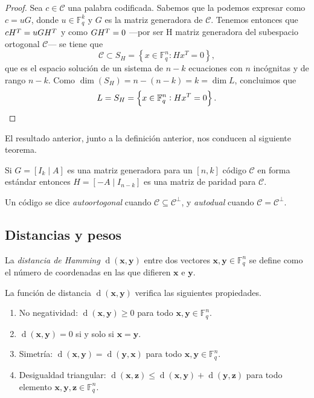 \begin{proof}
  Sea \(c \in \mathcal C\) una palabra codificada. Sabemos que la podemos expresar como \(c = uG\), donde \(u \in \mathbb F_q^k\) y \(G\) es la matriz generadora de \(\mathcal C\). Tenemos entonces que \(c\cramped{H^T} = uG\cramped{H^T}\) y como \(G\cramped{H^T} = 0\) —por ser H matriz generadora del subespacio ortogonal \(\mathcal C\)— se tiene que \[\mathcal C \subset S_H = \left\{x \in \mathbb F_q^n : Hx^T = 0\right\},\] que es el espacio solución de un sistema de \(n - k\) ecuaciones con \(n\) incógnitas y de rango \(n - k\). Como \(\dim(S_H) = n - (n - k) = k = \dim L\), concluimos que \[L = S_H = \left\{x \in \mathbb F_q^n : Hx^T = 0\right\}.\qedhere\]
\end{proof}

El resultado anterior, junto a la definición anterior, nos conducen al siguiente teorema. 

\begin{theorem}
  Si \(G = [I_k \mid A]\) es una matriz generadora para un \([n, k]\) código \(\mathcal C\) en forma estándar entonces \(H = [-A \mid I_{n-k}]\) es una matriz de paridad para \(\mathcal C\).
\end{theorem}

Un código se dice \textit{autoortogonal} cuando \(\mathcal C \subseteq \mathcal C^{\perp}\), y \textit{autodual} cuando \(\mathcal C = \mathcal C^{\perp}\).

\subsection{Distancias y pesos}

\begin{definition}
  La \textit{distancia de Hamming} \(\operatorname{d}(\symbf{x}, \symbf{y})\) entre dos vectores \(\symbf{x}, \symbf{y} \in \mathbb F_q^n\) se define como el número de coordenadas en las que difieren \(\symbf{x}\) e \(\symbf{y}\).
\end{definition}

\begin{theorem}
  La función de distancia \(\operatorname{d}(\symbf{x}, \symbf{y})\) verifica las siguientes propiedades.
  \begin{enumerate}
    \item No negatividad: \(\operatorname{d}(\symbf{x}, \symbf{y}) \geq 0\) para todo \(\symbf{x}, \symbf{y}\in \mathbb F_q^n\).
    \item \(\operatorname{d}(\symbf{x}, \symbf{y}) = 0\) si y solo si \(\symbf{x} = \symbf{y}\).
    \item Simetría: \(\operatorname{d}(\symbf{x}, \symbf{y}) = \operatorname{d}(\symbf{y}, \symbf{x})\) para todo \(\symbf{x}, \symbf{y}\in \mathbb F_q^n\).
    \item Desigualdad triangular: \(\operatorname{d}(\symbf{x}, \symbf{z}) \leq \operatorname{d}(\symbf{x}, \symbf{y}) + \operatorname{d}(\symbf{y}, \symbf{z})\) para todo elemento \(\symbf{x}, \symbf{y}, \symbf{z}\in \mathbb F_q^n\).
  \end{enumerate}
\end{theorem}

